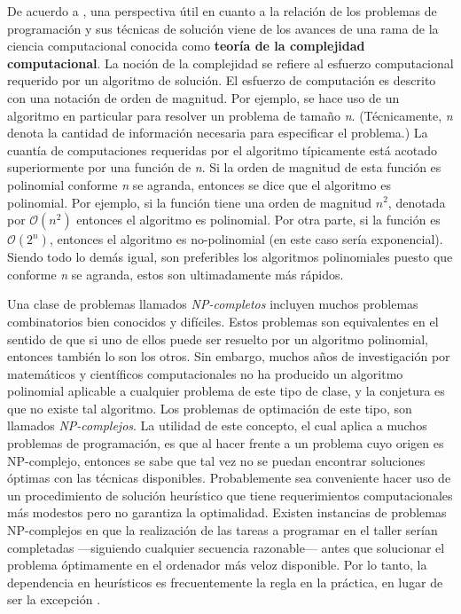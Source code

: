 \documentclass[spanish,draft,12pt,headsepline,footsepline,paper=letter]{scrreprt}
\newcommand{\BigO}{\ensuremath{\mathcal{O}}}%
\begin{document}
De acuerdo a \cite[p.~6]{Baker2009}, una perspectiva útil en cuanto a la relación de los problemas de programación y sus técnicas de solución viene de los avances de una rama de la ciencia computacional conocida como \textbf{teoría de la complejidad computacional}. La noción de la complejidad se refiere al esfuerzo computacional requerido por un algoritmo de solución. El esfuerzo de computación es descrito con una notación de orden de magnitud.
%
Por ejemplo, se hace uso de un algoritmo en particular para resolver un problema de tamaño \textit{n}. (Técnicamente, \textit{n} denota la cantidad de información necesaria para especificar el problema.) La cuantía de computaciones requeridas por el algoritmo típicamente está acotado superiormente por una función de \textit{n}. Si la orden de magnitud de esta función es polinomial conforme \textit{n} se agranda, entonces se dice que el algoritmo es polinomial.
%
Por ejemplo, si la función tiene una orden de magnitud $\textit{n}^2$, denotada por $\BigO(\textit{n}^2)$ entonces el algoritmo es polinomial. Por otra parte, si la función es $\BigO(2^\textit{n})$, entonces el algoritmo es no-polinomial (en este caso sería exponencial). Siendo todo lo demás igual, son preferibles los algoritmos polinomiales puesto que conforme \textit{n} se agranda, estos son ultimadamente más rápidos.

Una clase de problemas llamados \textit{NP-completos} incluyen muchos problemas combinatorios bien conocidos y difíciles. Estos problemas son equivalentes en el sentido de que si uno de ellos puede ser resuelto por un algoritmo polinomial, entonces también lo son los otros. Sin embargo, muchos años de investigación por matemáticos y científicos computacionales no ha producido un algoritmo polinomial aplicable a cualquier problema de este tipo de clase, y la conjetura es que no existe tal algoritmo. Los problemas de optimación de este tipo, son llamados \textit{NP-complejos}. La utilidad de este concepto, el cual aplica a muchos problemas de programación, es que al hacer frente a un problema cuyo origen es NP-complejo, entonces se sabe que tal vez no se puedan encontrar soluciones óptimas con las técnicas disponibles. Probablemente sea conveniente hacer uso de un procedimiento de solución heurístico que tiene requerimientos computacionales más modestos pero no garantiza la optimalidad. Existen instancias de problemas NP-complejos en que la realización de las tareas a programar en el taller serían completadas —siguiendo cualquier secuencia razonable— antes que solucionar el problema óptimamente en el ordenador más veloz disponible. Por lo tanto, la dependencia en heurísticos es frecuentemente la regla en la práctica, en lugar de ser la excepción \citep[p.~6]{Baker2009}.
\end{document}
